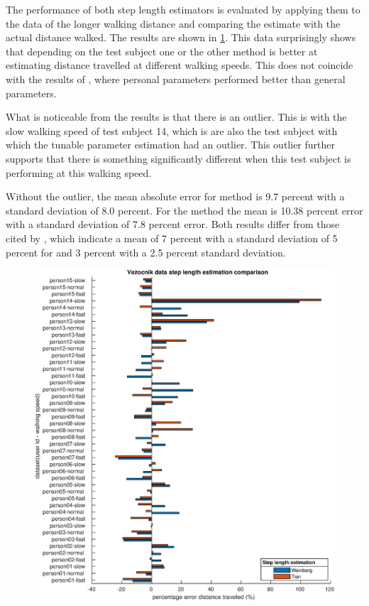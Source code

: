 The performance of both step length estimators is evaluated by applying them to the data of the longer walking distance and comparing the estimate with the actual distance walked. The results are shown in  \cref{fig:202011131943_wienberg_vs_tian_vezocnik_data1}. This data surprisingly shows that depending on the test subject one or the other method is better at estimating distance travelled at different walking speeds. This does not coincide with the results of \cite{Vezocnik2019}, where personal parameters performed better than general parameters.

What is noticeable from the results is that there is an outlier. This is with the slow walking speed of test subject 14, which is are also the test subject with which the tunable parameter estimation had an outlier. This outlier further supports that there is something significantly different when this test subject is performing at this walking speed.\par 

 Without the outlier, the mean absolute error for \citet{Tian2016} method is 9.7 percent with a standard deviation of 8.0 percent. For the \citet{weinberg} method the mean is 10.38 percent error with a standard deviation of 7.8 percent error. Both results differ from those cited by \cite{Vezocnik2019}, which indicate a mean of 7 percent with a standard deviation of 5 percent for \citet{Tian2016} and 3 percent with a 2.5 percent standard deviation.

\par

\begin{figure}[H]
	\centering
	\includegraphics[width=\linewidth]{images/20201113_1943_wienberg_vs_tian_vezocnik_data_1}
	\caption{}
	\label{fig:202011131943_wienberg_vs_tian_vezocnik_data1}
\end{figure}
 
